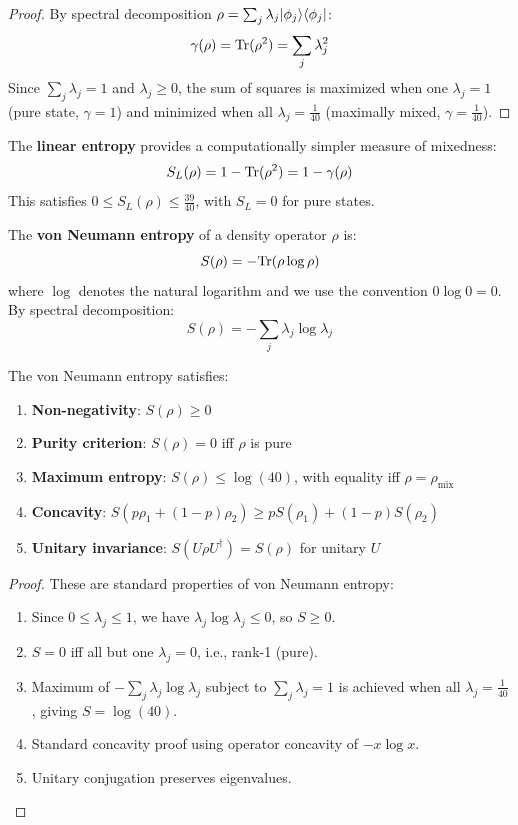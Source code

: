 \begin{proof}
By spectral decomposition $\rho = \sum_j \lambda_j |\phi_j\rangle\langle \phi_j|$:
\[
\gamma(\rho) = \mathrm{Tr}(\rho^2) = \sum_j \lambda_j^2
\]
Since $\sum_j \lambda_j = 1$ and $\lambda_j \geq 0$, the sum of squares is maximized when one $\lambda_j = 1$ (pure state, $\gamma = 1$) and minimized when all $\lambda_j = \frac{1}{40}$ (maximally mixed, $\gamma = \frac{1}{40}$).
\end{proof}

\begin{definition}
\label{def:linear-entropy}
The \textbf{linear entropy} provides a computationally simpler measure of mixedness:
\[
S_L(\rho) = 1 - \mathrm{Tr}(\rho^2) = 1 - \gamma(\rho)
\]
This satisfies $0 \leq S_L(\rho) \leq \frac{39}{40}$, with $S_L = 0$ for pure states.
\end{definition}

\begin{definition}
\label{def:von-neumann-entropy}
The \textbf{von Neumann entropy} of a density operator $\rho$ is:
\[
S(\rho) = -\mathrm{Tr}(\rho \log \rho)
\]
where $\log$ denotes the natural logarithm and we use the convention $0 \log 0 = 0$. By spectral decomposition:
\[
S(\rho) = -\sum_j \lambda_j \log \lambda_j
\]
\end{definition}

\begin{proposition}
\label{prop:entropy-properties}
The von Neumann entropy satisfies:
\begin{enumerate}
  \item \textbf{Non-negativity}: $S(\rho) \geq 0$
  \item \textbf{Purity criterion}: $S(\rho) = 0$ iff $\rho$ is pure
  \item \textbf{Maximum entropy}: $S(\rho) \leq \log(40)$, with equality iff $\rho = \rho_{\mathrm{mix}}$
  \item \textbf{Concavity}: $S(p\rho_1 + (1-p)\rho_2) \geq p S(\rho_1) + (1-p) S(\rho_2)$
  \item \textbf{Unitary invariance}: $S(U\rho U^\dagger) = S(\rho)$ for unitary $U$
\end{enumerate}
\end{proposition}

\begin{proof}
These are standard properties of von Neumann entropy:
\begin{enumerate}
  \item Since $0 \leq \lambda_j \leq 1$, we have $\lambda_j \log \lambda_j \leq 0$, so $S \geq 0$.
  \item $S = 0$ iff all but one $\lambda_j = 0$, i.e., rank-1 (pure).
  \item Maximum of $-\sum_j \lambda_j \log \lambda_j$ subject to $\sum_j \lambda_j = 1$ is achieved when all $\lambda_j = \frac{1}{40}$, giving $S = \log(40)$.
  \item Standard concavity proof using operator concavity of $-x\log x$.
  \item Unitary conjugation preserves eigenvalues.
\end{enumerate}
\end{proof}

